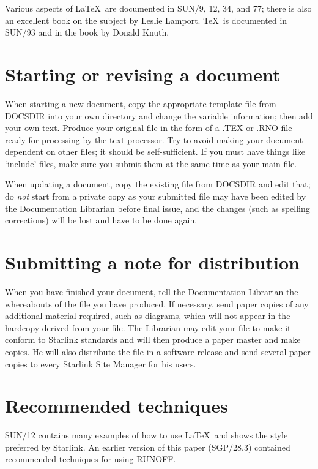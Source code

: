 Various aspects of \LaTeX\ are documented in SUN/9, 12, 34, and 77; there is
also an excellent book on the subject by Leslie Lamport.
\TeX\ is documented in SUN/93 and in the book by Donald Knuth.

\section{Starting or revising a document}

When starting a new document, copy the appropriate template file from DOCSDIR
into your own directory and change the variable information; then add your
own text.
Produce your original file in the form of a .TEX or .RNO file ready for
processing by the text processor.
Try to avoid making your document dependent on other files; it should be
self-sufficient.
If you must have things like `include' files, make sure you submit them at
the same time as your main file.

When updating a document, copy the existing file from DOCSDIR and edit
that; do {\em not} start from a private copy as your submitted file may have
been edited by the Documentation Librarian before final issue, and the changes
(such as spelling corrections) will be lost and have to be done again.

\section{Submitting a note for distribution}

When you have finished your document, tell the Documentation Librarian the
whereabouts of the file you have produced.
If necessary, send paper copies of any additional material required, such as
diagrams, which will not appear in the hardcopy derived from your file.
The Librarian may edit your file to make it conform to Starlink standards and
will then produce a paper master and make copies.
He will also distribute the file in a software release and send several paper
copies to every Starlink Site Manager for his users.

\section{Recommended techniques}

SUN/12 contains many examples of how to use \LaTeX\ and shows the style
preferred by Starlink.
An earlier version of this paper (SGP/28.3) contained recommended techniques
for using RUNOFF.

